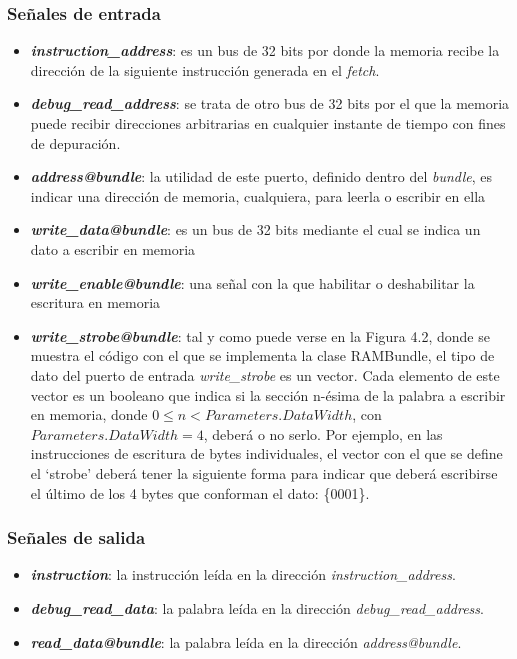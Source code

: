 \subsubsection{Señales de entrada}

\begin{itemize}
  \item \textbf{\textit{instruction\_address}}: es un bus de 32 bits por donde la memoria recibe la dirección de la siguiente instrucción generada en el \textit{fetch}.
  \vspace{-0.2cm}
  \item \textbf{\textit{debug\_read\_address}}: se trata de otro bus de 32 bits por el que la memoria puede recibir direcciones arbitrarias en cualquier instante de tiempo con fines de depuración.
  \vspace{-0.2cm}
  \item \textbf{\textit{address@bundle}}: la utilidad de este puerto, definido dentro del \textit{bundle}, es indicar una dirección de memoria, cualquiera, para leerla o escribir en ella
  \vspace{-0.2cm}
  \item \textbf{\textit{write\_data@bundle}}: es un bus de 32 bits mediante el cual se indica un dato a escribir en memoria
  \vspace{-0.2cm}
  \item \textbf{\textit{write\_enable@bundle}}: una señal con la que habilitar o deshabilitar la escritura en memoria
  \vspace{-0.2cm}
  \item \textbf{\textit{write\_strobe@bundle}}: tal y como puede verse en la Figura 4.2, donde se muestra el código con el que se implementa la clase RAMBundle, el tipo de dato del puerto de entrada \textit{write\_strobe} es un vector. Cada elemento de este vector es un booleano que indica si la sección n-ésima de la palabra a escribir en memoria, donde $0 \le n < Parameters.DataWidth$, con $Parameters.DataWidth = 4$, deberá o no serlo. Por ejemplo, en las instrucciones de escritura de bytes individuales, el vector con el que se define el `strobe' deberá tener la siguiente forma para indicar que deberá escribirse el último de los 4 bytes que conforman el dato: \{0001\}.
\end{itemize}

\subsubsection{Señales de salida}
\begin{itemize}
  \item \textbf{\textit{instruction}}: la instrucción leída en la dirección \textit{instruction\_address}.
  \vspace{-0.2cm}
  \item \textbf{\textit{debug\_read\_data}}: la palabra leída en la dirección \textit{debug\_read\_address}.
  \vspace{-0.2cm}
  \item \textbf{\textit{read\_data@bundle}}: la palabra leída en la dirección \textit{address@bundle}.
\end{itemize}

